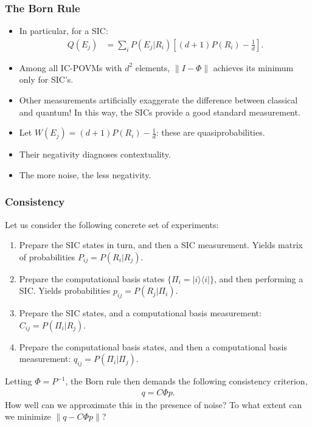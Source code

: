 \documentclass{beamer}
\begin{document}
\begin{frame}
\frametitle{The Born Rule}
\begin{itemize}
\item In particular, for a SIC:
\begin{align}
Q(E_j) &=\sum_{i} P(E_j|R_i)\left[(d+1)P(R_i)-\frac{1}{d}\right]	.
\end{align}	
\item Among all IC-POVMs with $d^2$ elements, $\lVert I - \Phi \rVert$ achieves its minimum only for SIC's.
\item Other measurements artificially exaggerate the difference between classical and quantum! In this way, the SICs provide a good standard measurement.
\item  Let $W(E_j)=(d+1)P(R_i)-\frac{1}{d}$: these are quasiprobabilities. 
\item Their negativity diagnoses contextuality.
\item The more noise, the less negativity.
\end{itemize}
	
\end{frame}

\begin{frame}
\frametitle{Consistency}
Let us consider the following concrete set of experiments:
\begin{enumerate}
\item Prepare the SIC states in turn, and then a SIC measurement. Yields matrix of probabilities $P_{ij}=P(R_i|R_j)$.
\item Prepare the computational basis states $\{\Pi_i=|i\rangle\langle i|\}$, and then performing a SIC. Yields probabilities $p_{ij} = P(R_j|\Pi_i)$.
\item Prepare the SIC states, and a computational basis measurement: $C_{ij}=P(\Pi_i|R_j)$.
\item Prepare the computational basis states, and then a computational basis measurement: $q_{ij}=P(\Pi_i|\Pi_j)$.
\end{enumerate}
	Letting $\Phi=P^{-1}$, the Born rule then demands the following consistency criterion,
\begin{align}
q = C\Phi p.	
\end{align}
How well can we approximate this in the presence of noise? To what extent can we minimize $ \lVert q - C\Phi p	\rVert$?
\end{frame}
\end{document}
